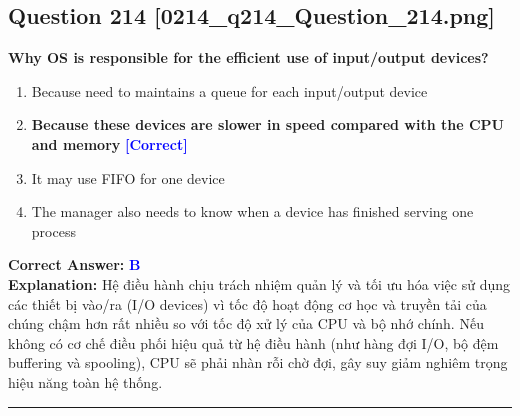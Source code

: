 \documentclass[11pt,a4paper]{article}
\begin{document}
\begin{minipage}{\textwidth}
\subsection*{Question 214 \quad \footnotesize{[0214\_q214\_Question\_214.png]}}
\noindent \textbf{Why OS is responsible for the efficient use of input/output devices?}

\begin{enumerate}[label=\Alph*.]
    \item Because need to maintains a queue for each input/output device
    \item \textbf{Because these devices are slower in speed compared with the CPU and memory} \hfill \textcolor{blue}{\textbf{[Correct]}}
    \item It may use FIFO for one device
    \item The manager also needs to know when a device has finished serving one process
\end{enumerate}

\noindent \textbf{Correct Answer:} \textcolor{blue}{\textbf{B}} \\[2pt]
\noindent \textbf{Explanation:} Hệ điều hành chịu trách nhiệm quản lý và tối ưu hóa việc sử dụng các thiết bị vào/ra (I/O devices) vì tốc độ hoạt động cơ học và truyền tải của chúng chậm hơn rất nhiều so với tốc độ xử lý của CPU và bộ nhớ chính. Nếu không có cơ chế điều phối hiệu quả từ hệ điều hành (như hàng đợi I/O, bộ đệm buffering và spooling), CPU sẽ phải nhàn rỗi chờ đợi, gây suy giảm nghiêm trọng hiệu năng toàn hệ thống.

\par\vspace{0.3cm}
\hrule
\vspace{0.3cm}
\end{minipage}
\end{document}
